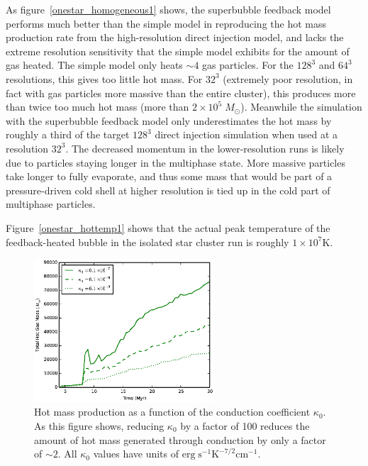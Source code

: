 As figure~\ref{onestar_homogeneous1} shows, the superbubble feedback model
performs much better than the simple model in reproducing the hot mass
production rate from the high-resolution direct injection model, and lacks the
extreme resolution sensitivity that the simple model exhibits for the amount of
gas heated. The simple model only heats $\sim 4$ gas particles.  For the $128^3$
and $64^3$ resolutions, this gives too little hot mass.  For $32^3$ (extremely
poor resolution, in fact with gas particles more massive than the entire
cluster), this produces more than twice too much hot mass (more than
$2\times10^5\;M_\odot$). Meanwhile the simulation with the superbubble feedback
model only underestimates the hot mass by roughly a third of the target $128^3$
direct injection simulation when used at a resolution $32^3$.  The decreased
momentum in the lower-resolution runs is likely due to particles staying longer
in the multiphase state.  More massive particles take longer to fully evaporate,
and thus some mass that would be part of a pressure-driven cold shell at higher
resolution is tied up in the cold part of multiphase particles.

Figure~\ref{onestar_hottemp1}  shows that the actual peak temperature of the
feedback-heated bubble in the isolated star cluster run is roughly
$1\times10^7\mathrm{K}$.


\begin{figure}
    \includegraphics[width=0.6\textwidth]{figures1/onestar_kappa.eps}
    \caption[Dependence of superbubble heated gas on conduction coefficient]{Hot
    mass production as a function of the conduction coefficient $\kappa_0$.  As
    this figure shows, reducing $\kappa_0$ by a factor of 100 reduces the amount
    of hot mass generated through conduction by only a factor of $\sim2$. All
    $\kappa_0$ values have units of $\mathrm{erg\; s^{-1} K^{-7/2} cm^{-1}}$.}
    \label{onestar_kappa1}
\end{figure}

